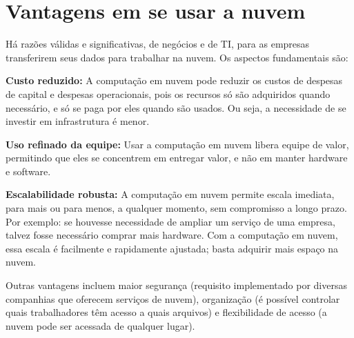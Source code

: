 \section{Vantagens em se usar a nuvem}

Há razões válidas e significativas, de negócios e de TI, para as empresas transferirem
seus dados para trabalhar na nuvem. Os aspectos fundamentais são:

\newcommand{\itemm}[1]{\item\textbf{#1}}

\begin{itemise}
    \itemm{Custo reduzido:} A computação em nuvem pode reduzir os custos de
        despesas de capital e despesas operacionais, pois os recursos só são adquiridos
        quando necessário, e só se paga por eles quando são usados. Ou seja, a necessidade
        de se investir em infrastrutura é menor.

    \itemm{Uso refinado da equipe:} Usar a computação em nuvem libera equipe de
        valor, permitindo que eles se concentrem em entregar valor, e não em manter
        hardware e software.

    \itemm {Escalabilidade robusta:} A computação em nuvem permite escala imediata,
        para mais ou para menos, a qualquer momento, sem compromisso a longo prazo.
        Por exemplo: se houvesse necessidade de ampliar um serviço de uma empresa, talvez
        fosse necessário comprar mais hardware. Com a computação em nuvem, essa escala
        é facilmente e rapidamente ajustada; basta adquirir mais espaço na nuvem.

\end{itemise}

Outras vantagens incluem maior segurança (requisito implementado por diversas companhias que
oferecem serviços de nuvem), organização (é possível controlar quais trabalhadores têm acesso
a quais arquivos) e flexibilidade de acesso (a nuvem pode ser acessada de qualquer lugar).

\undef\itemm
